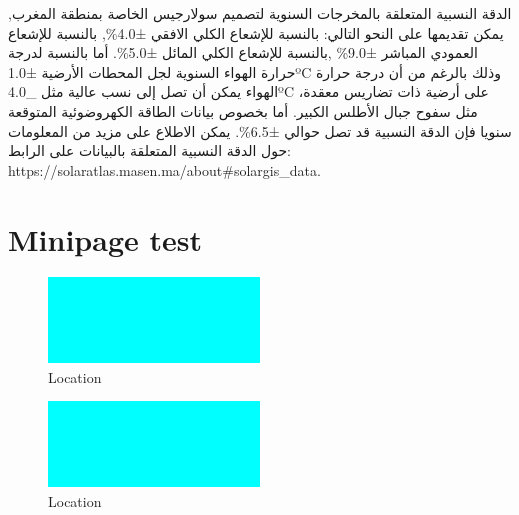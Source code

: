 \documentclass[11pt,a4paper]{article}
\begin{document}
\begin{Arabic}
الدقة النسبية
المتعلقة بالمخرجات السنوية  لتصميم سولارجيس الخاصة بمنطقة المغرب,
يمكن  تقديمها على النحو التالي: بالنسبة للإشعاع الكلي الافقي  ±4.0\%,
بالنسبة للإشعاع العمودي المباشر ±9.0\% ,بالنسبة للإشعاع الكلي المائل 
±5.0\%. أما بالنسبة لدرجة حرارة الهواء السنوية لجل المحطات الأرضية 
±1.0ºC وذلك بالرغم من أن درجة حرارة الهواء يمكن أن تصل إلى نسب عالية
مثل \_4.0ºC على أرضية ذات تضاريس معقدة، مثل سفوح جبال الأطلس الكبير. أما 
بخصوص بيانات الطاقة الكهروضوئية المتوقعة سنويا فإن الدقة النسبية قد تصل 
حوالي ±6.5\%. يمكن الاطلاع على مزيد من المعلومات حول الدقة النسبية المتعلقة 
بالبيانات على الرابط: https://solaratlas.masen.ma/about\#solargis\_data.
\end{Arabic}

\section{ Minipage test }

\begin{minipage}{0.45\textwidth}
\begin{figure}[H]
\centering
\includegraphics[width=0.5\textwidth]{overview_map.png}
\caption{Location}  %
\end{figure}
\end{minipage}
\begin{minipage}{0.45\textwidth}
\begin{figure}[H]
\centering
\includegraphics[width=0.5\textwidth]{overview_map.png}
\caption{Location}  %
\end{figure}
\end{minipage}
\end{document}
